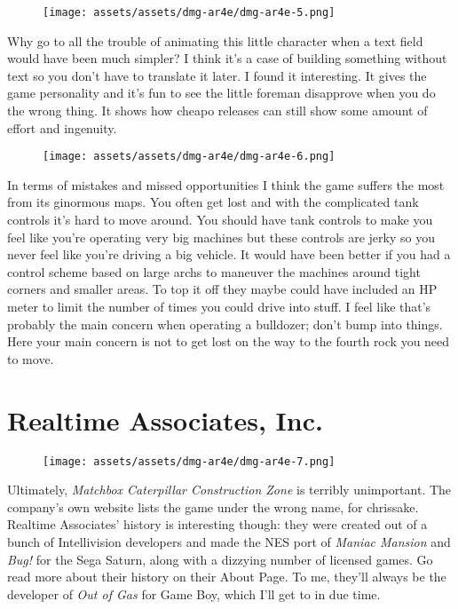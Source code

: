 \documentclass{book}
\begin{document}
\begin{figure}[hbt]
\vskip 10pt
\centering \texttt{[image: assets/assets/dmg-ar4e/dmg-ar4e-5.png]}
\vskip 6pt
\end{figure}
Why go to all the trouble of animating this little character when a text field would have been much simpler? I think it’s a case of building something without text so you don’t have to translate it later. I found it interesting. It gives the game personality and it’s fun to see the little foreman disapprove when you do the wrong thing. It shows how cheapo releases can still show some amount of effort and ingenuity.

\begin{figure}[hbt]
\vskip 10pt
\centering \texttt{[image: assets/assets/dmg-ar4e/dmg-ar4e-6.png]}
\vskip 6pt
\end{figure}
In terms of mistakes and missed opportunities I think the game suffers the most from its ginormous maps. You often get lost and with the complicated tank controls it’s hard to move around. You should have tank controls to make you feel like you’re operating very big machines but these controls are jerky so you never feel like you’re driving a big vehicle. It would have been better if you had a control scheme based on large archs to maneuver the machines around tight corners and smaller areas. To top it off they maybe could have included an HP meter to limit the number of times you could drive into stuff. I feel like that’s probably the main concern when operating a bulldozer; don’t bump into things. Here your main concern is not to get lost on the way to the fourth rock you need to move.

\FloatBarrier\needspace{5pt}\section*{Realtime Associates, Inc.}\nopagebreak[4]

\begin{figure}[hbt]
\vskip 10pt
\centering \texttt{[image: assets/assets/dmg-ar4e/dmg-ar4e-7.png]}
\vskip 6pt
\end{figure}
Ultimately, \emph{Matchbox Caterpillar Construction Zone} is terribly unimportant. The company’s own website lists the game under the wrong name, for chrissake. Realtime Associates’ history is interesting though: they were created out of a bunch of Intellivision developers and made the NES port of \emph{Maniac Mansion} and \emph{Bug!} for the Sega Saturn, along with a dizzying number of licensed games. Go read more about their history on their About Page. To me, they’ll always be the developer of \emph{Out of Gas} for Game Boy, which I’ll get to in due time.
\end{document}
